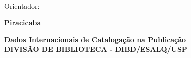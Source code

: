\documentclass[book,A4paper,10pt,twoside,oldfontcommands]{memoir}\usepackage[]{graphicx}\usepackage[usenames,dvipsnames]{color}
\begin{document}
\vspace{10pt}
\begin{center}
  \begin{center}
    { \fontsize{14}{14} \sffamily \bfseries
    }\\
    {\small\sffamily{\Revisada}}
  \end{center}

  \vspace{60pt}
  \begin{flushright}
    \begin{minipage}{0.5\textwidth}
      { \fontsize{10}{10} \sffamily
        Orientador:\\
        \DoutorOuDoutora\:
        \textbf{\MakeUppercase{\Orientador}}
      }
    \end{minipage}
  \end{flushright}

  \vspace{20pt}
  \begin{flushright}
    \begin{minipage}{0.5\textwidth}
      { \fontsize{10}{10} \sffamily
      }
    \end{minipage}
  \end{flushright}

  \vfill

  \begin{center}
    { \fontsize{14}{14} \sffamily \bfseries
      Piracicaba\\
    }
  \end{center}

\end{center} 

\newpage



\phantom{foo}

\vfill

\begin{minipage}{1.0\textwidth}
  \begin{center}
    { \fontsize{8}{8} \sffamily \bfseries
      \hspace{-2cm}Dados Internacionais de Catalogação na Publicação\\
      \hspace{-2cm}DIVISÃO DE BIBLIOTECA - DIBD/ESALQ/USP\\
    }
  \end{center}
\end{minipage}
\end{document}
